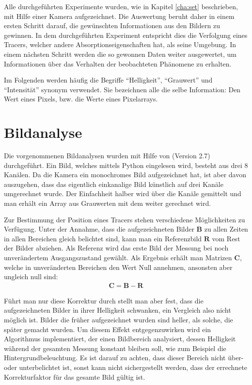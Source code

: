 \label{cha:meth}

Alle durchgeführten Experimente wurden, wie in Kapitel \ref{cha:set} beschrieben, mit Hilfe einer Kamera aufgezeichnet. Die Auswertung beruht daher in einem ersten Schritt darauf, die gewünschten Informationen aus den Bildern zu gewinnen. In dem durchgeführten Experiment entspricht dies die Verfolgung eines Tracers, welcher andere Absorptionseigenschaften hat, als seine Umgebung.
In einem nächsten Schritt werden die so gewonnen Daten weiter ausgewertet, um Informationen über das Verhalten der beobachteten Phänomene zu 
erhalten.

Im Folgenden werden häufig die Begriffe ``Helligkeit'', ``Grauwert'' und ``Intensität'' synonym verwendet. Sie bezeichnen alle die selbe Information: Den Wert eines Pixels, bzw. die Werte eines Pixelarrays.

\section{Bildanalyse}
\label{sec:ima}
Die vorgenommenen Bildanalysen wurden mit Hilfe von \cite{python} (Version 2.7) durchgeführt. 
Ein Bild, welches mittels Python eingelesen wird, besteht aus drei \SI{8}{\bit} Kanälen. Da die Kamera ein monochromes Bild aufgezeichnet hat, ist aber davon auszugehen, dass das eigentlich einkanalige Bild künstlich auf drei Kanäle umgerechnet wurde. Der Einfachheit halber wird über die Kanäle gemittelt und man erhält ein Array aus Grauwerten mit dem weiter gerechnet wird.

Zur Bestimmung der Position eines Tracers stehen verschiedene Möglichkeiten zu Verfügung.
Unter der Annahme, dass die aufgezeichneten Bilder $\mathbf{B}$ zu allen Zeiten in allen Bereichen gleich belichtet sind, kann man ein Referenzbild $\mathbf{R}$ vom Rest der Bilder abziehen. Als Referenz wird das erste Bild der Messung bei noch unverändertem Ausgangszustand gewählt. Als Ergebnis erhält man Matrizen $\mathbf{C}$, welche in unveränderten Bereichen den Wert Null annehmen, ansonsten aber ungleich null sind:
\begin{eqnarray}
 \mathbf{C} = \mathbf{B} - \mathbf{R}
\end{eqnarray}


Führt man nur diese Korrektur durch stellt man aber fest, dass die aufgezeichneten Bilder in ihrer Helligkeit schwanken, ein Vergleich also nicht möglich ist. Bilder die früher aufgezeichnet wurden sind heller, als solche, die später gemacht wurden. Um diesem Effekt entgegenzuwirken wird ein Algorithmus implementiert, der einen Bildbereich analysiert, dessen Helligkeit während der gesamten Messung konstant bleiben soll, wie zum Beispiel die Hintergrundbeleuchtung. Es ist darauf zu achten, dass dieser Bereich nicht über- oder unterbelichtet ist, sonst kann nicht sichergestellt werden, dass der errechnete Korrekturfaktor für das gesamte Bild gültig ist. 

